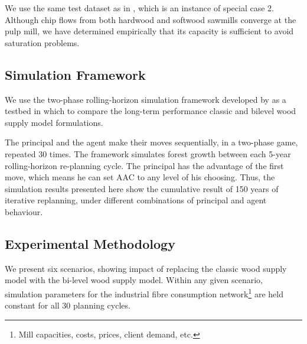 We use the same test dataset as in \citet{paradis2013risk}, which is an instance of special case 2. Although chip flows from both hardwood and softwood sawmills converge at the pulp mill, we have determined empirically that its capacity is sufficient to avoid saturation problems.

\subsection{Simulation Framework}

We use the two-phase rolling-horizon simulation framework developed by \citet{paradis2013risk} as a testbed in which to compare the long-term performance classic and bilevel wood supply model formulations. 

The principal and the agent make their moves sequentially, in a two-phase game, repeated 30 times. The framework simulates forest growth between each 5-year rolling-horizon re-planning cycle. The principal has the advantage of the first move, which means he can set AAC to any level of his choosing. Thus, the simulation results presented here show the cumulative result of 150 years of iterative replanning, under different combinations of principal and agent behaviour. 



\subsection{Experimental Methodology}
\label{sec:experimental_methodology2}

We present six scenarios, showing impact of replacing the classic wood supply model with the bi-level wood supply model. Within any given scenario, simulation parameters for the industrial fibre consumption network\footnote{Mill capacities, costs, prices, client demand, etc.} are held constant for all 30 planning cycles. 

